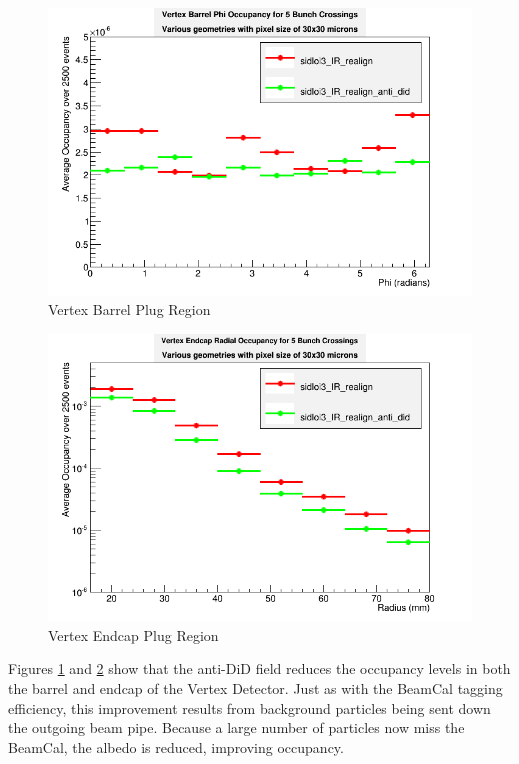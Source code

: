 \documentclass{report}
\begin{document}
                \begin{figure}[H] 
                    \includegraphics[width=\textwidth]{VradOccupancy_base_brl}
                    \centering
                    \caption{Vertex Barrel Plug Region}
                    \label{fig__did_vertex_brl}
                \end{figure}
                \begin{figure}[H] 
                    \includegraphics[width=\textwidth]{VradOccupancy_base_ecp}
                    \centering
                    \caption{Vertex Endcap Plug Region}
                    \label{fig__did_vertex_ecp}
                \end{figure}

                Figures \ref{fig__did_vertex_brl} and \ref{fig__did_vertex_ecp} show that the anti-DiD field reduces the occupancy levels in both the barrel and endcap of the Vertex Detector. Just as with the BeamCal tagging efficiency, this improvement results from background particles being sent down the outgoing beam pipe. Because a large number of particles now miss the BeamCal, the albedo is reduced, improving occupancy.
\end{document}
